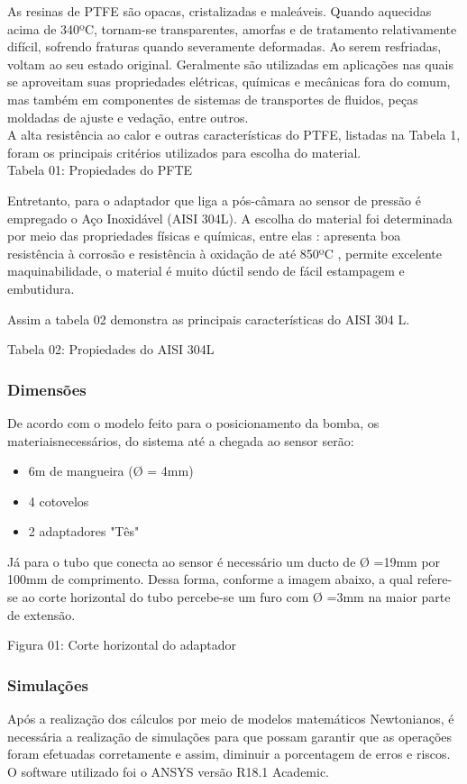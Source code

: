 As resinas de PTFE são opacas, cristalizadas e maleáveis. Quando aquecidas acima de 340ºC, tornam-se transparentes, amorfas e de tratamento relativamente difícil, sofrendo fraturas quando severamente deformadas. Ao serem resfriadas, voltam ao seu estado original. Geralmente são utilizadas em aplicações nas quais se aproveitam suas propriedades elétricas, químicas e mecânicas fora do comum, mas também em componentes de sistemas de transportes de fluidos, peças moldadas de ajuste e vedação, entre outros.\\

A alta resistência ao calor e outras características do PTFE, listadas na Tabela 1, foram os principais critérios utilizados para escolha do material.\\

\caption{Tabela 01: Propiedades do PFTE}

Entretanto, para o adaptador que liga a pós-câmara ao sensor de pressão é empregado o Aço Inoxidável (AISI 304L). A escolha do material foi determinada por meio das propriedades físicas e químicas, entre elas : apresenta boa resistência à corrosão e resistência à oxidação de até 850ºC , permite excelente maquinabilidade, o material é muito dúctil sendo de fácil estampagem e  embutidura.

Assim a tabela 02 demonstra as principais características do AISI 304 L.

\caption{Tabela 02: Propiedades do AISI 304L}
\subsubsection{Dimensões}
De acordo com o modelo feito para o posicionamento da bomba, os materiaisnecessários, do sistema até a chegada ao sensor serão:
\begin{itemize}
\item 6m de mangueira (Ø = 4mm)
\item 4 cotovelos
\item 2 adaptadores "Tês"
\end{itemize}

Já para o tubo que conecta ao sensor é necessário um ducto de Ø =19mm por 100mm de comprimento. Dessa forma, conforme a imagem abaixo, a qual refere-se ao corte horizontal do tubo percebe-se um furo com Ø =3mm na maior parte de extensão.

\caption{Figura 01: Corte horizontal do adaptador}

\subsubsection{Simulações}
Após a realização dos cálculos por meio de modelos matemáticos Newtonianos, é necessária a realização de simulações para que possam garantir que as operações foram efetuadas corretamente e assim, diminuir a porcentagem de erros e riscos. O software utilizado foi o ANSYS versão R18.1 Academic.

